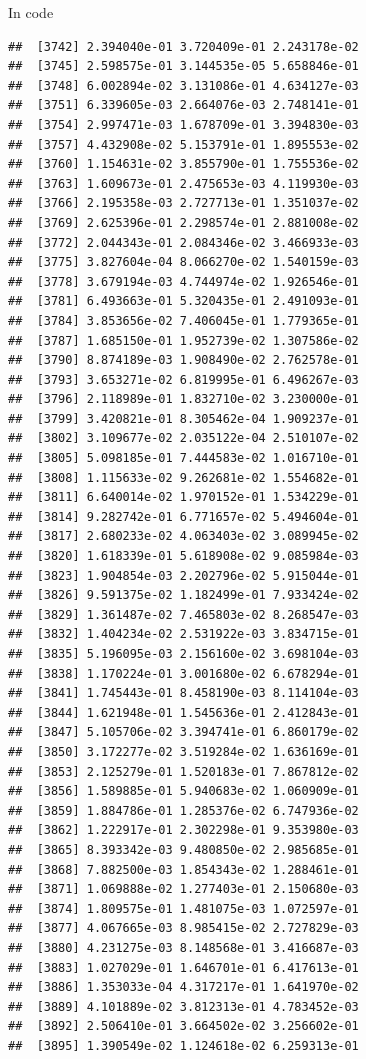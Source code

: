 \documentclass[ignorenonframetext,]{beamer}
\begin{document}
\begin{frame}[fragile]{In code}
\begin{verbatim}
##  [3742] 2.394040e-01 3.720409e-01 2.243178e-02
##  [3745] 2.598575e-01 3.144535e-05 5.658846e-01
##  [3748] 6.002894e-02 3.131086e-01 4.634127e-03
##  [3751] 6.339605e-03 2.664076e-03 2.748141e-01
##  [3754] 2.997471e-03 1.678709e-01 3.394830e-03
##  [3757] 4.432908e-02 5.153791e-01 1.895553e-02
##  [3760] 1.154631e-02 3.855790e-01 1.755536e-02
##  [3763] 1.609673e-01 2.475653e-03 4.119930e-03
##  [3766] 2.195358e-03 2.727713e-01 1.351037e-02
##  [3769] 2.625396e-01 2.298574e-01 2.881008e-02
##  [3772] 2.044343e-01 2.084346e-02 3.466933e-03
##  [3775] 3.827604e-04 8.066270e-02 1.540159e-03
##  [3778] 3.679194e-03 4.744974e-02 1.926546e-01
##  [3781] 6.493663e-01 5.320435e-01 2.491093e-01
##  [3784] 3.853656e-02 7.406045e-01 1.779365e-01
##  [3787] 1.685150e-01 1.952739e-02 1.307586e-02
##  [3790] 8.874189e-03 1.908490e-02 2.762578e-01
##  [3793] 3.653271e-02 6.819995e-01 6.496267e-03
##  [3796] 2.118989e-01 1.832710e-02 3.230000e-01
##  [3799] 3.420821e-01 8.305462e-04 1.909237e-01
##  [3802] 3.109677e-02 2.035122e-04 2.510107e-02
##  [3805] 5.098185e-01 7.444583e-02 1.016710e-01
##  [3808] 1.115633e-02 9.262681e-02 1.554682e-01
##  [3811] 6.640014e-02 1.970152e-01 1.534229e-01
##  [3814] 9.282742e-01 6.771657e-02 5.494604e-01
##  [3817] 2.680233e-02 4.063403e-02 3.089945e-02
##  [3820] 1.618339e-01 5.618908e-02 9.085984e-03
##  [3823] 1.904854e-03 2.202796e-02 5.915044e-01
##  [3826] 9.591375e-02 1.182499e-01 7.933424e-02
##  [3829] 1.361487e-02 7.465803e-02 8.268547e-03
##  [3832] 1.404234e-02 2.531922e-03 3.834715e-01
##  [3835] 5.196095e-03 2.156160e-02 3.698104e-03
##  [3838] 1.170224e-01 3.001680e-02 6.678294e-01
##  [3841] 1.745443e-01 8.458190e-03 8.114104e-03
##  [3844] 1.621948e-01 1.545636e-01 2.412843e-01
##  [3847] 5.105706e-02 3.394741e-01 6.860179e-02
##  [3850] 3.172277e-02 3.519284e-02 1.636169e-01
##  [3853] 2.125279e-01 1.520183e-01 7.867812e-02
##  [3856] 1.589885e-01 5.940683e-02 1.060909e-01
##  [3859] 1.884786e-01 1.285376e-02 6.747936e-02
##  [3862] 1.222917e-01 2.302298e-01 9.353980e-03
##  [3865] 8.393342e-03 9.480850e-02 2.985685e-01
##  [3868] 7.882500e-03 1.854343e-02 1.288461e-01
##  [3871] 1.069888e-02 1.277403e-01 2.150680e-03
##  [3874] 1.809575e-01 1.481075e-03 1.072597e-01
##  [3877] 4.067665e-03 8.985415e-02 2.727829e-03
##  [3880] 4.231275e-03 8.148568e-01 3.416687e-03
##  [3883] 1.027029e-01 1.646701e-01 6.417613e-01
##  [3886] 1.353033e-04 4.317217e-01 1.641970e-02
##  [3889] 4.101889e-02 3.812313e-01 4.783452e-03
##  [3892] 2.506410e-01 3.664502e-02 3.256602e-01
##  [3895] 1.390549e-02 1.124618e-02 6.259313e-01

\end{verbatim}
\end{frame}
\end{document}
